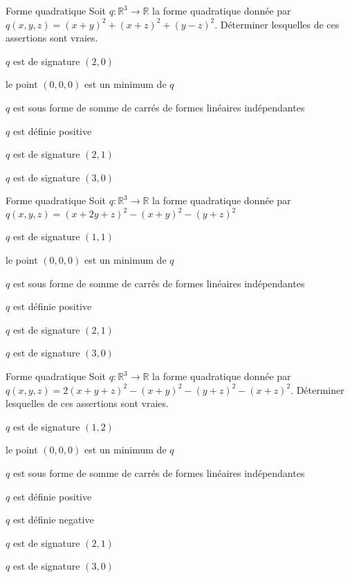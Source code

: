 \documentclass[12pt]{article}
\begin{document}
\begin{quiz}[points=3, multiple, shuffle, penalty=.5]
  \begin{multi}{Forme quadratique}
    Soit $q:\mathbb{R}^3\to \mathbb{R}$ la forme quadratique donn\'{e}e par $q(x,y,z) = (x + y)^2 + (x+z)^2 + (y-z)^2$. D\'{e}terminer lesquelles de ces assertions sont vraies.

  \item* $q$ est de signature $(2,0)$
  \item* le point $(0,0,0)$ est un minimum de $q$
  \item $q$ est sous forme de somme de carr\'{e}s de formes lin\'{e}aires ind\'{e}pendantes
  \item $q$ est d\'{e}finie positive
  \item $q$ est de signature $(2,1)$
  \item $q$ est de signature $(3,0)$
  \end{multi}

  \begin{multi}{Forme quadratique}
    Soit $q:\mathbb{R}^3\to \mathbb{R}$ la forme quadratique donn\'{e}e par $q(x,y,z)=(x + 2y + z)^2 - (x + y)^2 - (y + z)^2$

  \item* $q$ est de signature $(1,1)$
  \item le point $(0,0,0)$ est un minimum de $q$
  \item $q$ est sous forme de somme de carr\'{e}s de formes lin\'{e}aires ind\'{e}pendantes
  \item $q$ est d\'{e}finie positive
  \item $q$ est de signature $(2,1)$
  \item $q$ est de signature $(3,0)$
  \end{multi}

  \begin{multi}{Forme quadratique}
    Soit $q:\mathbb{R}^3\to \mathbb{R}$ la forme quadratique donn\'{e}e par $q(x,y,z) = 2(x +y + z)^2 - (x + y)^2 - (y +z)^2 - (x +z)^2$. D\'{e}terminer lesquelles de ces assertions sont vraies.

  \item* $q$ est de signature $(1,2)$
  \item le point $(0,0,0)$ est un minimum de $q$
  \item $q$ est sous forme de somme de carr\'{e}s de formes lin\'{e}aires ind\'{e}pendantes
  \item $q$ est d\'{e}finie positive
  \item $q$ est d\'{e}finie negative
  \item $q$ est de signature $(2,1)$
  \item $q$ est de signature $(3,0)$
  \end{multi}

\end{quiz}
\end{document}
